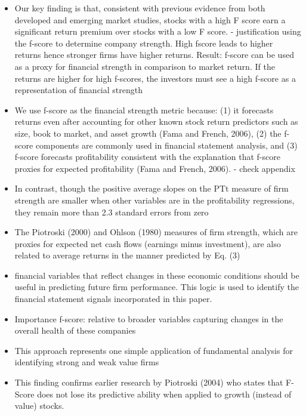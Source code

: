 \documentclass[12pt]{article}
\begin{document}
        \begin{itemize}

            \item Our key finding is that, consistent with previous evidence from both developed and emerging market studies, stocks with a high F score earn a significant return premium over stocks with a low F score. \citep{Hyde2014} - justification using the f-score to determine company strength. High fscore leads to higher returns hence stronger firms have higher returns. Result: f-score can be used as a proxy for financial strength in comparison to market return. If the returns are higher for high f-scores, the investors must see a high f-score as a representation of financial strength

            \item We use f-score as the financial strength metric because: (1) it forecasts returns even after accounting for other known stock return predictors such as size, book to market, and asset growth (Fama and French, 2006), (2) the f-score components are commonly used in financial statement analysis, and (3) f-score forecasts profitability consistent with the explanation that f-score proxies for expected profitability (Fama and French, 2006).\citep{Choi2012} - check appendix 

            \item In contrast, though the positive average slopes on the PTt measure of firm strength are smaller when other variables are in the profitability regressions, they remain more than 2.3 standard errors from zero \citep{Fama2006}

            \item The Piotroski (2000) and Ohlson (1980) measures of firm strength, which are proxies for expected net cash flows (earnings minus investment), are also related to average returns in the manner predicted by Eq. (3) \citep{Fama2006}

            \item financial variables that reflect changes in these economic conditions should be useful in predicting future firm performance. This logic is used to identify the financial statement signals incorporated in this paper. \citep{Piotroski2000}

            \item Importance f-score: relative to broader variables capturing changes in the overall health of these companies \citep{Piotroski2000}

            \item This approach represents one simple application of fundamental analysis for identifying strong and weak value firms \citep{Piotroski2000}

            \item This finding confirms earlier research by Piotroski (2004) who states that F-Score does not lose its predictive ability when applied to growth (instead of value) stocks. \citep{Mohr2012}

        \end{itemize}
\end{document}
